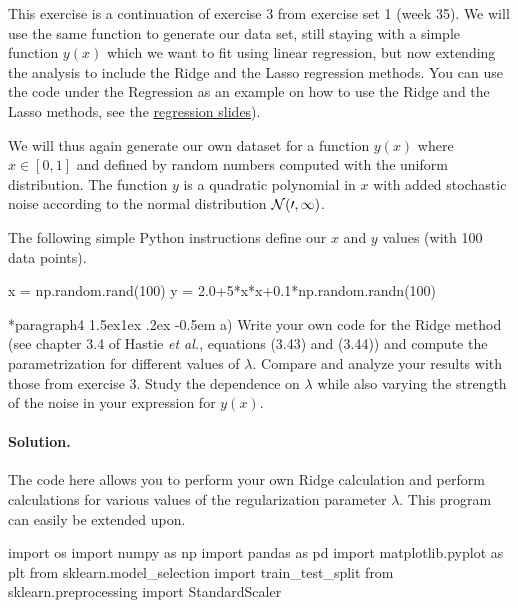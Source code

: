 \documentclass[%
oneside,                 %
final,                   %
10pt]{article}
\makeatletter
\newenvironment{doconceexercise}{}{}
\newcounter{doconceexercisecounter}
\newcommand\subex{\@startsection*{paragraph}{4}{\z@}%
                  {1.5ex\@plus1ex \@minus.2ex}%
                  {-0.5em}%
                  {\normalfont\normalsize\bfseries}}
\makeatother
\begin{document}
\begin{doconceexercise}



This exercise is a continuation of exercise 3 from exercise set 1 (week 35). We will
use the same function to generate our data set, still staying with a
simple function $y(x)$ which we want to fit using linear regression,
but now extending the analysis to include the Ridge and the Lasso
regression methods. You can use the code under the Regression as an example on how to use the Ridge and the Lasso methods, see the \href{{https://compphysics.github.io/MachineLearning/doc/pub/Regression/html/Regression-bs.html}}{regression slides}). 

We will thus again generate our own dataset for a function $y(x)$ where 
$x \in [0,1]$ and defined by random numbers computed with the uniform
distribution. The function $y$ is a quadratic polynomial in $x$ with
added stochastic noise according to the normal distribution $\cal{N}(0,1)$.

The following simple Python instructions define our $x$ and $y$ values (with 100 data points).
\begin{print}
x = np.random.rand(100)
y = 2.0+5*x*x+0.1*np.random.randn(100)
\end{print}


\subex{a)}
Write your own code for the Ridge method (see chapter 3.4 of Hastie \emph{et al.}, equations (3.43) and (3.44)) and compute the parametrization for different values of $\lambda$. Compare and analyze your results with those from exercise 3. Study the dependence on $\lambda$ while also varying the strength of the noise in your expression for $y(x)$.


\paragraph{Solution.}
The code here allows you to perform your own Ridge calculation and perform calculations for various values of the regularization parameter $\lambda$. This program can easily be extended upon.
\begin{print}
import os
import numpy as np
import pandas as pd
import matplotlib.pyplot as plt
from sklearn.model_selection import train_test_split
from sklearn.preprocessing import StandardScaler


\end{print}
\end{doconceexercise}
\end{document}

